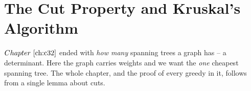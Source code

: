 \section{The Cut Property and Kruskal's Algorithm}\label{sec:c17-kruskal}

\begin{previouslybox}
\(\chref{c32}\) ended with \emph{how many} spanning trees a graph has -- a
determinant.  Here the graph carries weights and we want the \emph{one}
cheapest spanning tree.  The whole chapter, and the proof of every greedy in it,
follows from a single lemma about cuts.
\end{previouslybox}

